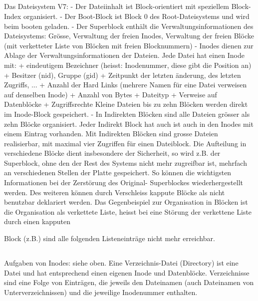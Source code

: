 \subsection{}
\begin{answer}
Das Dateisystem V7:
- Der Dateiinhalt ist Block-orientiert mit speziellem Block-Index organisiert.
- Der Boot-Block ist Block 0 des Root-Dateisystems und wird beim booten geladen.
- Der Superblock enthält die Verwaltungsinformationen des Dateisystems: Grösse, Verwaltung der
freien Inodes, Verwaltung der freien Blöcke (mit verketteter Liste von Blöcken mit freien Blocknummern)
- Inodes dienen zur Ablage der Verwaltungsinformationen der Dateien. Jede Datei hat einen Inode
mit:
+ eindeutigem Bezeichner (heisst: Inodenummer, diese gibt die Position an)
+ Besitzer (nid), Gruppe (gid)
+ Zeitpunkt der letzten änderung, des letzten Zugriffs, ...
+ Anzahl der Hard Links (mehrere Namen für eine Datei verweisen auf denselben Inode)
+ Anzahl von Bytes
+ Dateityp
+ Verweise auf Datenblöcke
+ Zugriffsrechte
Kleine Dateien bis zu zehn Blöcken werden direkt im Inode-Block gespeichert.
- In Indirekten Blöcken sind alle Dateien grösser als zehn Blöcke organisiert. Jeder Indirekt Block
hat auch ist auch in den Inodes mit einem Eintrag vorhanden. Mit Indirekten Blöcken sind grosse
Dateien realisierbar, mit maximal vier Zugriffen für einen Dateiblock.
Die Aufteilung in verschiedene Blöcke dient insbesondere der Sicherheit, so wird z.B. der Superblock,
ohne den der Rest des Systems nicht mehr zugreifbar ist, mehrfach an verschiedenen Stellen
der Platte gespeichert. So können die wichtigsten Informationen bei der Zerstörung des Original-
Superblockes wiederhergestellt werden. Des weiteren können durch Verschleiss kappute Blöcke als
nicht benutzbar deklariert werden. Das Gegenbeispiel zur Organisation in Blöcken ist die Organisation
als verkettete Liste, heisst bei eine Störung der verkettene Liste durch einen kapputen

Block (z.B.) sind alle folgenden Listeneinträge nicht mehr erreichbar.
\end{answer}

\subsection{}
\begin{answer}
Aufgaben von Inodes: siehe oben. Eine Verzeichnis-Datei (Directory) ist eine Datei und hat entsprechend
einen eigenen Inode und Datenblöcke. Verzeichnisse sind eine Folge von Einträgen, die
jeweils den Dateinamen (auch Dateinamen von Unterverzeichnissen) und die jeweilige Inodenummer
enthalten.
\end{answer}

